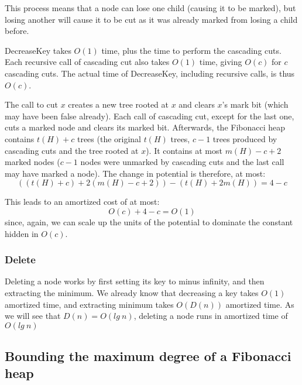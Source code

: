 This process means that a node can lose one child (causing it to be marked), but losing
another will cause it to be cut as it was already marked from losing a child before.

DecreaseKey takes $O(1)$ time, plus the time to perform the cascading cuts. Each recursive
call of cascading cut also takes $O(1)$ time, giving $O(c)$ for $c$ cascading cuts. The actual
time of DecreaseKey, including recursive calls, is thus $O(c)$.

The call to cut $x$ creates a new tree rooted at $x$ and clears $x$'s mark bit (which may have
been false already). Each call of cascading cut, except for the last one, cuts a marked node and
clears its marked bit. Afterwards, the Fibonacci heap contains $t(H)+c$ trees (the original $t(H)$ trees,
$c-1$ trees produced by cascading cuts and the tree rooted at $x$). It contains at most 
$m(H)- c + 2$ marked nodes ($c-1$ nodes were unmarked by cascading cuts and the last call may have marked
a node). The change in potential is therefore, at most:
\[
	((t(H)+c) + 2(m(H) - c + 2)) - (t(H) + 2m(H)) = 4 - c
\]

This leads to an amortized cost of at most:
\[
	O(c) + 4 - c = O(1)
\]
since, again, we can scale up the units of the potential to dominate the constant hidden in $O(c)$.

\subsubsection{Delete}
Deleting a node works by first setting its key to minus infinity, and then extracting the minimum.
We already know that decreasing a key takes $O(1)$ amortized time, and extracting minimum takes
$O(D(n))$ amortized time. As we will see that $D(n) = O(lg\ n)$, deleting a node runs in amortized
time of $O(lg\ n)$

\subsection{Bounding the maximum degree of a Fibonacci heap}
